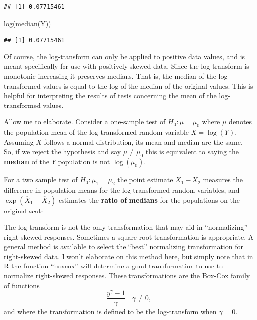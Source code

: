 \documentclass[
]{book}
\newenvironment{Shaded}{\begin{snugshade}}{\end{snugshade}}
\newcommand{\FunctionTok}[1]{\textcolor[rgb]{0.00,0.00,0.00}{#1}}
\newcommand{\NormalTok}[1]{#1}
\begin{document}
\begin{verbatim}
## [1] 0.07715461
\end{verbatim}

\begin{Shaded}
\begin{Highlighting}[]
\FunctionTok{log}\NormalTok{(}\FunctionTok{median}\NormalTok{(Y))}
\end{Highlighting}
\end{Shaded}

\begin{verbatim}
## [1] 0.07715461
\end{verbatim}

Of course, the log-transform can only be applied to positive data values, and is meant specifically for use with positively skewed data. Since the log transform is monotonic increasing it preserves medians. That is, the median of the log-transformed values is equal to the log of the median of the original values. This is helpful for interpreting the results of tests concerning the mean of the log-transformed values.

Allow me to elaborate. Consider a one-sample test of \(H_0:\mu = \mu_0\) where \(\mu\) denotes the population mean of the log-transformed random variable \(X = \log(Y)\). Assuming \(X\) follows a normal distribution, its mean and median are the same. So, if we reject the hypothesis and say \(\mu \ne \mu_0\) this is equivalent to saying the \textbf{median} of the \(Y\) population is not \(\log(\mu_0)\).

For a two sample test of \(H_0:\mu_1 = \mu_2\) the point estimate \(\overline X_1 - \overline X_2\) measures the difference in population means for the log-transformed random variables, and \(\exp(\overline X_1 - \overline X_2)\) estimates the \textbf{ratio of medians} for the populations on the original scale.

The log transform is not the only transformation that may aid in ``normalizing'' right-skewed responses. Sometimes a square root transformation is appropriate. A general method is available to select the ``best'' normalizing transformation for right-skewed data. I won't elaborate on this method here, but simply note that in R the function ``boxcox'' will determine a good transformation to use to normalize right-skewed responses. These transformations are the Box-Cox family of functions
\[\frac{y^\gamma - 1}{\gamma}\quad \gamma \ne 0, \]
and where the transformation is defined to be the log-transform when \(\gamma = 0\).
\end{document}
